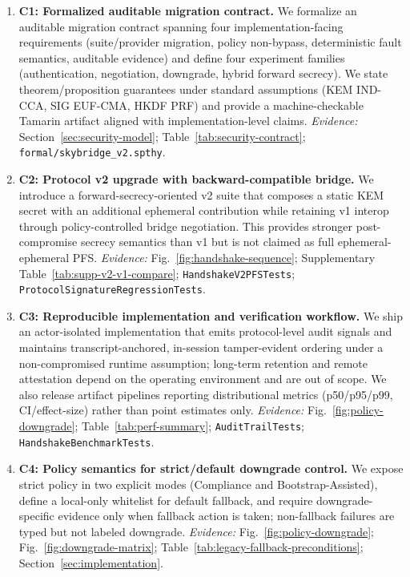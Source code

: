 \documentclass[10pt,journal,compsoc]{IEEEtran}
\begin{document}
\begin{enumerate}
\item
  \textbf{C1: Formalized auditable migration contract.}
  We formalize an auditable migration contract spanning four
  implementation-facing requirements (suite/provider migration, policy
  non-bypass, deterministic fault semantics, auditable evidence) and
  define four experiment families (authentication, negotiation,
  downgrade, hybrid forward secrecy). We state theorem/proposition
  guarantees under standard assumptions (KEM IND-CCA, SIG EUF-CMA, HKDF
  PRF) and provide a machine-checkable Tamarin artifact aligned with
  implementation-level claims.
  \textit{Evidence:} Section~\ref{sec:security-model}; Table~\ref{tab:security-contract};
  \texttt{formal/skybridge\_v2.spthy}.
\item
  \textbf{C2: Protocol v2 upgrade with backward-compatible bridge.}
  We introduce a forward-secrecy-oriented v2 suite that composes a
  static KEM secret with an additional ephemeral contribution while
  retaining v1 interop through policy-controlled bridge negotiation.
  This provides stronger post-compromise secrecy semantics than v1 but
  is not claimed as full ephemeral-ephemeral PFS.
  \textit{Evidence:} Fig.~\ref{fig:handshake-sequence};
  Supplementary Table~\ref{tab:supp-v2-v1-compare};
  \texttt{HandshakeV2PFSTests};
  \texttt{ProtocolSignatureRegressionTests}.
\item
  \textbf{C3: Reproducible implementation and verification workflow.}
  We ship an actor-isolated implementation that emits protocol-level
  audit signals and maintains transcript-anchored, in-session
  tamper-evident ordering under a non-compromised runtime assumption;
  long-term retention and remote attestation depend on the operating
  environment and are out of scope. We
  also release artifact pipelines reporting distributional metrics
  (p50/p95/p99, CI/effect-size) rather than point estimates only.
  \textit{Evidence:} Fig.~\ref{fig:policy-downgrade}; Table~\ref{tab:perf-summary};
  \texttt{AuditTrailTests};
  \texttt{Handshake\allowbreak Benchmark\allowbreak Tests}.
\item
  \textbf{C4: Policy semantics for strict/default downgrade control.}
  We expose strict policy in two explicit modes (Compliance and
  Bootstrap-Assisted), define a local-only whitelist for default fallback,
  and require downgrade-specific evidence only when fallback action is
  taken; non-fallback failures are typed but not labeled downgrade.
  \textit{Evidence:} Fig.~\ref{fig:policy-downgrade}; Fig.~\ref{fig:downgrade-matrix};
  Table~\ref{tab:legacy-fallback-preconditions}; Section~\ref{sec:implementation}.
\end{enumerate}
\end{document}
